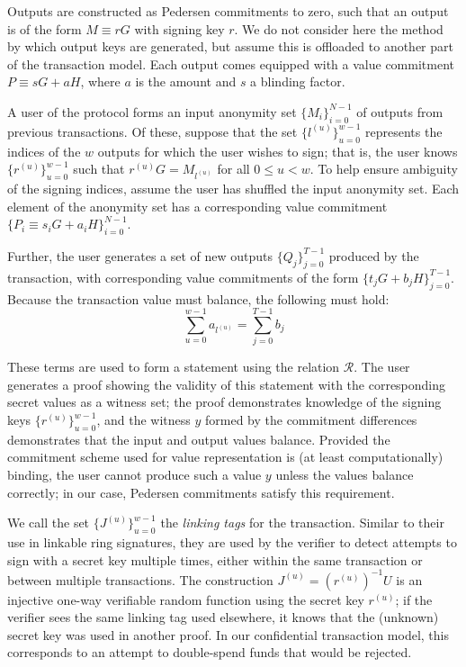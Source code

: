\documentclass{article}
\theoremstyle{definition}
\begin{document}
Outputs are constructed as Pedersen commitments to zero, such that an output is of the form $M \equiv rG$ with signing key $r$.
We do not consider here the method by which output keys are generated, but assume this is offloaded to another part of the transaction model.
Each output comes equipped with a value commitment $P \equiv sG + aH$, where $a$ is the amount and $s$ a blinding factor.

A user of the protocol forms an input anonymity set $\{M_i\}_{i=0}^{N-1}$ of outputs from previous transactions.
Of these, suppose that the set $\{l^{(u)}\}_{u=0}^{w-1}$ represents the indices of the $w$ outputs for which the user wishes to sign; that is, the user knows $\{r^{(u)}\}_{u=0}^{w-1}$ such that $r^{(u)}G = M_{l^{(u)}}$ for all $0 \leq u < w$.
To help ensure ambiguity of the signing indices, assume the user has shuffled the input anonymity set.
Each element of the anonymity set has a corresponding value commitment $\{P_i \equiv s_iG + a_iH\}_{i=0}^{N-1}$.

Further, the user generates a set of new outputs $\{Q_j\}_{j=0}^{T-1}$ produced by the transaction, with corresponding value commitments of the form $\{t_jG + b_jH\}_{j=0}^{T-1}$.
Because the transaction value must balance, the following must hold: $$\sum_{u=0}^{w-1} a_{l^{(u)}} = \sum_{j=0}^{T-1} b_j$$

These terms are used to form a statement using the relation $\mathcal{R}$.
The user generates a proof showing the validity of this statement with the corresponding secret values as a witness set; the proof demonstrates knowledge of the signing keys $\{r^{(u)}\}_{u=0}^{w-1}$, and the witness $y$ formed by the commitment differences demonstrates that the input and output values balance.
Provided the commitment scheme used for value representation is (at least computationally) binding, the user cannot produce such a value $y$ unless the values balance correctly; in our case, Pedersen commitments satisfy this requirement.

We call the set $\{J^{(u)}\}_{u=0}^{w-1}$ the \textit{linking tags} for the transaction.
Similar to their use in linkable ring signatures, they are used by the verifier to detect attempts to sign with a secret key multiple times, either within the same transaction or between multiple transactions.
The construction $J^{(u)} = (r^{(u)})^{-1}U$ is an injective one-way verifiable random function \cite{dodis} using the secret key $r^{(u)}$; if the verifier sees the same linking tag used elsewhere, it knows that the (unknown) secret key was used in another proof.
In our confidential transaction model, this corresponds to an attempt to double-spend funds that would be rejected.
\end{document}
